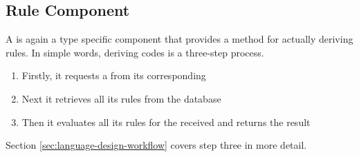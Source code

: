 \subsection{Rule Component}\label{subsec:rule-component}
A  is again a type specific component that provides a method for actually deriving rules.
In simple words, deriving codes is a three-step process.
\begin{enumerate}
    \item Firstly, it requests a \REI from its corresponding \REIF
    \item Next it retrieves all its rules from the database
    \item Then it evaluates all its rules for the received \REI and returns the result
\end{enumerate}
Section \ref{sec:language-design-workflow} covers step three in more detail.

